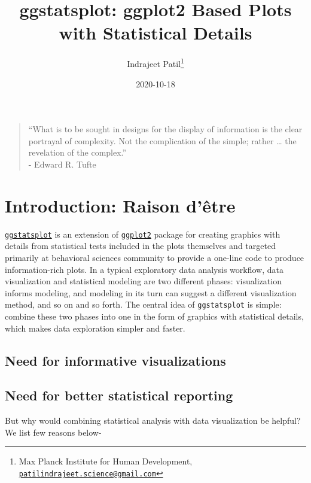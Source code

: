 \documentclass[
]{article}
\title{ggstatsplot: ggplot2 Based Plots with Statistical Details}
\author{Indrajeet Patil\footnote{Max Planck Institute for Human Development, \href{mailto:patilindrajeet.science@gmail.com}{\nolinkurl{patilindrajeet.science@gmail.com}}}}
\date{2020-10-18}
\begin{document}
\maketitle

{
\hypersetup{linkcolor=}
\setcounter{tocdepth}{2}
\tableofcontents
}
\begin{quote}
``What is to be sought in designs for the display of information is the clear
portrayal of complexity. Not the complication of the simple; rather \ldots{} the
revelation of the complex.''\\
- Edward R. Tufte
\end{quote}

\hypertarget{introduction-raison-duxeatre}{%
\section{Introduction: Raison d'être}\label{introduction-raison-duxeatre}}

\href{https://indrajeetpatil.github.io/ggstatsplot/}{\texttt{ggstatsplot}} is an extension
of \href{https://github.com/tidyverse/ggplot2}{\texttt{ggplot2}} package for creating
graphics with details from statistical tests included in the plots themselves
and targeted primarily at behavioral sciences community to provide a one-line
code to produce information-rich plots. In a typical exploratory data analysis
workflow, data visualization and statistical modeling are two different phases:
visualization informs modeling, and modeling in its turn can suggest a
different visualization method, and so on and so forth. The central idea of
\texttt{ggstatsplot} is simple: combine these two phases into one in the form of
graphics with statistical details, which makes data exploration simpler and
faster.

\hypertarget{need-for-informative-visualizations}{%
\subsection{Need for informative visualizations}\label{need-for-informative-visualizations}}

\hypertarget{need-for-better-statistical-reporting}{%
\subsection{Need for better statistical reporting}\label{need-for-better-statistical-reporting}}

But why would combining statistical analysis with data visualization be helpful?
We list few reasons below-
\end{document}
